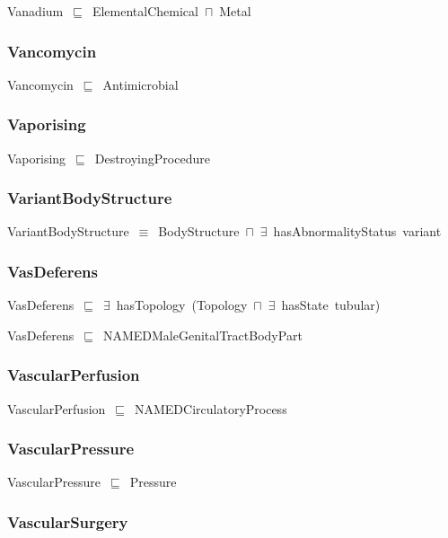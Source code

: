 \documentclass{article}
\begin{document}
Vanadium~\ensuremath{\sqsubseteq}~ElementalChemical~\ensuremath{\sqcap}~Metal~

\subsubsection*{Vancomycin}

Vancomycin~\ensuremath{\sqsubseteq}~Antimicrobial~

\subsubsection*{Vaporising}

Vaporising~\ensuremath{\sqsubseteq}~DestroyingProcedure~

\subsubsection*{VariantBodyStructure}

VariantBodyStructure~\ensuremath{\equiv}~BodyStructure~\ensuremath{\sqcap}~\ensuremath{\exists}~hasAbnormalityStatus~variant

\subsubsection*{VasDeferens}

VasDeferens~\ensuremath{\sqsubseteq}~\ensuremath{\exists}~hasTopology~(Topology~\ensuremath{\sqcap}~\ensuremath{\exists}~hasState~tubular)~

VasDeferens~\ensuremath{\sqsubseteq}~NAMEDMaleGenitalTractBodyPart~

\subsubsection*{VascularPerfusion}

VascularPerfusion~\ensuremath{\sqsubseteq}~NAMEDCirculatoryProcess~

\subsubsection*{VascularPressure}

VascularPressure~\ensuremath{\sqsubseteq}~Pressure~

\subsubsection*{VascularSurgery}
\end{document}
